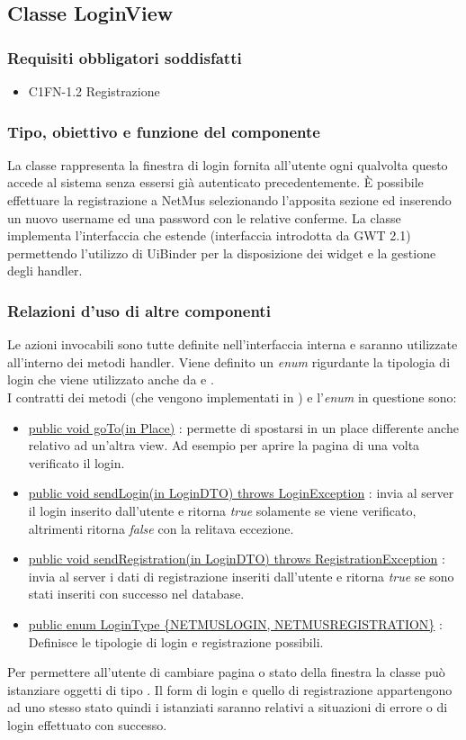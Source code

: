 \subsection{Classe LoginView}
\subsubsection*{Requisiti obbligatori soddisfatti}
\begin{itemize}
	\item C1FN-1.2 Registrazione
\end{itemize}
\subsubsection*{Tipo, obiettivo e funzione del componente}
La classe  rappresenta la finestra di login fornita all'utente
ogni qualvolta questo accede al sistema senza essersi gi\`a autenticato
precedentemente. \`E possibile effettuare la registrazione a NetMus
selezionando l'apposita sezione ed inserendo un nuovo username ed una password
con le relative conferme. La classe  implementa l'interfaccia
 che estende  (interfaccia introdotta da GWT 2.1)
permettendo l'utilizzo di UiBinder per la disposizione dei widget e la gestione
degli handler. 
\subsubsection*{Relazioni d'uso di altre componenti} Le azioni invocabili
sono tutte definite nell'interfaccia interna
 e saranno utilizzate all'interno dei metodi handler. Viene
definito un \emph{enum} rigurdante la tipologia di login che viene utilizzato
anche da  e . \\ I contratti dei metodi (che vengono
implementati in ) e l'\emph{enum} in questione sono:
\begin{itemize}
  \item \underline{public void goTo(in Place)} : permette di spostarsi in un
  place differente anche relativo ad un'altra view. Ad esempio per aprire la pagina di
   una volta verificato il login.
  \item \underline{public void sendLogin(in LoginDTO) throws  LoginException}
  : invia al server il login inserito dall'utente e ritorna \emph{true} solamente se viene
  verificato, altrimenti ritorna \emph{false} con la relitava eccezione.
  \item \underline{public void sendRegistration(in LoginDTO) throws
  RegistrationException} : invia al server i dati di registrazione inseriti
  dall'utente e ritorna \emph{true} se sono stati inseriti con successo nel database.
  \item \underline{public enum LoginType \{NETMUSLOGIN, NETMUSREGISTRATION\}} :
  Definisce le tipologie di login e registrazione possibili.
\end{itemize}
Per permettere all'utente di cambiare pagina o stato della finestra la classe
pu\`o istanziare oggetti di tipo . Il form di login e quello di
registrazione appartengono ad uno stesso stato quindi i 
istanziati saranno relativi a situazioni di errore o di login effettuato con successo. 
